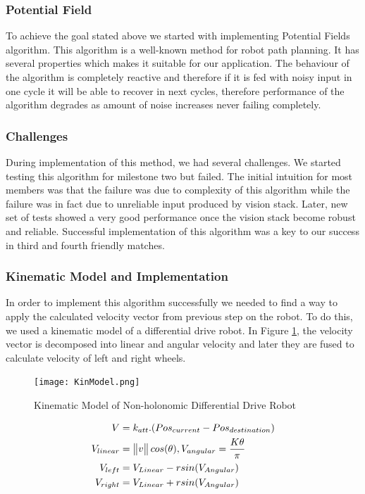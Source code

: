 \subsubsection{Potential Field}
To achieve the goal stated above we started with implementing Potential Fields\cite{paper:PF} algorithm. This algorithm is a well-known method for robot path planning. It has several properties which makes it suitable for our application. The behaviour of the algorithm is completely reactive and therefore if it is fed with noisy input in one cycle it will be able to recover in next cycles, therefore performance of the algorithm degrades as amount of noise increases never failing completely.\linebreak

\subsubsection{Challenges}
During implementation of this method, we had several challenges. We started testing this algorithm for milestone two but failed. The initial intuition for most members was that the failure was due to complexity of this algorithm while the failure was in fact due to unreliable input produced by vision stack. Later, new set of tests showed a very good performance once the vision stack become robust and reliable. Successful implementation of this algorithm was a key to our success in third and fourth friendly matches.\linebreak

\subsubsection{Kinematic Model and Implementation}
In order to implement this algorithm successfully we needed to find a way to apply the calculated velocity vector from previous step on the robot. To do this, we used a kinematic model of a differential drive robot. In Figure \ref{fig:KinModel}, the velocity vector is decomposed into linear and angular velocity and later they are fused to calculate velocity of left and right wheels.
\begin{figure}[htp]
\begin{center}
\leavevmode
\texttt{[image: KinModel.png]}
\end{center}
\caption{Kinematic Model of Non-holonomic Differential Drive Robot}
\label{fig:KinModel}
\end{figure}

\begin{align}
V & =k_{att}.(Pos_{current}-Pos_{destination})\\
V_{linear} &= \begin{Vmatrix}v\end{Vmatrix} cos(\theta) ,
V_{angular} = {K\theta \over \pi}\\
V_{left}&=V_{Linear}-rsin(V_{Angular})\\
V_{right}&=V_{Linear}+rsin(V_{Angular})
\end{align}

